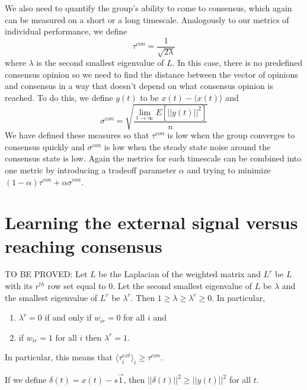 \documentclass{article}
\begin{document}
We also need to quantify the group's ability to come to consensus, which again can be measured on a short or a long timescale.  Analogously to our metrics of individual performance, we define
\begin{equation}
\tau^{con}=\frac{1}{\sqrt{2\lambda}}
\end{equation}
where $\lambda$ is the second smallest eigenvalue of $L$.  In this case, there is no predefined consensus opinion so we need to find the distance between the vector of opinions and consensus in a way that doesn't depend on what consensus opinion is reached.  To do this, we define $y(t)$ to be $x(t)-\langle x(t)\rangle$ and 
\begin{equation}
\sigma^{con}=\sqrt{\frac{\lim_{t\to\infty}E[||y(t)||^2]}{n}}
\end{equation}
We have defined these measures so that $\tau^{con}$ is low when the group converges to consensus quickly and $\sigma^{con}$ is low when the steady state noise around the consensus state is low.  Again the metrics for each timescale can be combined into one metric by introducing a tradeoff parameter $\alpha$ and trying to minimize $(1-\alpha)\tau^{con}+\alpha\sigma^{con}$.

\section{Learning the external signal versus reaching consensus}
\begin{lemma} \label{myconjecture}
TO BE PROVED:  Let $L$ be the Laplacian of the weighted matrix and $L^r$ be $L$ with its $r^{th}$ row set equal to $0$.  Let the second smallest eigenvalue of $L$ be $\lambda$ and the smallest eigenvalue of $L^r$ be $\lambda^r$.  Then $1\geq \lambda \geq \lambda^r\geq 0$.  In particular,
\begin{enumerate}
\item $\lambda^r=0$ if and only if $w_{ir}=0$ for all $i$ and
\item if $w_{ir}=1$ for all $i$ then $\lambda^r=1$.
\end{enumerate}
\end{lemma}

In particular, this means that $\langle\tau_i^{ext}\rangle_i\geq \tau^{con}$.

\begin{lemma}
If we define $\delta(t)=x(t)-s\vec{1}$, then $||\delta(t)||^2\geq||y(t)||^2$ for all $t$.
\end{lemma}
\end{document}
